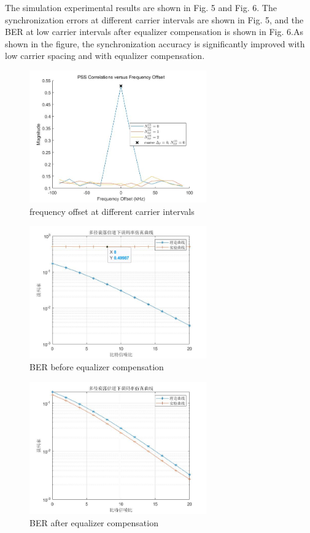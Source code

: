 \documentclass[english]{cccconf}
\begin{document}
The simulation experimental results are shown in Fig. 5 and Fig. 6. The synchronization errors at different carrier intervals are shown in Fig. 5, and the BER at low carrier intervals after equalizer compensation is shown in Fig. 6.As shown in the figure, the synchronization accuracy is significantly improved with low carrier spacing and with equalizer compensation.
\begin{figure}[htbp]
	\centering
	\setcounter{figure}{6}
	\includegraphics[width=3in]{fig6.png}
	\caption{frequency offset at different carrier intervals}
\end{figure}
\begin{figure}[htbp]
	\centering
	\setcounter{figure}{8}
	\includegraphics[width=3in]{fig8.png}
	\caption{BER before equalizer compensation}
\end{figure}
\begin{figure}[htbp]
	\centering
	\setcounter{figure}{9}
	\includegraphics[width=3in]{fig9.png}
	\caption{BER after equalizer compensation}
\end{figure}
\end{document}
